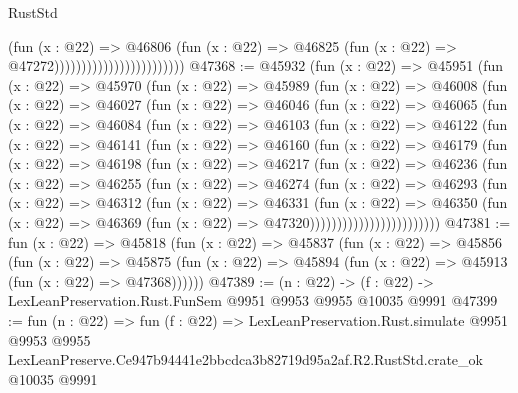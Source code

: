 \begin{lexlean}{RustStd}
\begin{coremodule}
                                              (fun (x : @22) =>
                                              @46806
                                                (fun (x : @22) =>
                                                @46825
                                                  (fun (x : @22) => @47272))))))))))))))))))))))))
@47368 := @45932
    (fun (x : @22) =>
    @45951
      (fun (x : @22) =>
      @45970
        (fun (x : @22) =>
        @45989
          (fun (x : @22) =>
          @46008
            (fun (x : @22) =>
            @46027
              (fun (x : @22) =>
              @46046
                (fun (x : @22) =>
                @46065
                  (fun (x : @22) =>
                  @46084
                    (fun (x : @22) =>
                    @46103
                      (fun (x : @22) =>
                      @46122
                        (fun (x : @22) =>
                        @46141
                          (fun (x : @22) =>
                          @46160
                            (fun (x : @22) =>
                            @46179
                              (fun (x : @22) =>
                              @46198
                                (fun (x : @22) =>
                                @46217
                                  (fun (x : @22) =>
                                  @46236
                                    (fun (x : @22) =>
                                    @46255
                                      (fun (x : @22) =>
                                      @46274
                                        (fun (x : @22) =>
                                        @46293
                                          (fun (x : @22) =>
                                          @46312
                                            (fun (x : @22) =>
                                            @46331
                                              (fun (x : @22) =>
                                              @46350
                                                (fun (x : @22) =>
                                                @46369
                                                  (fun (x : @22) => @47320))))))))))))))))))))))))
@47381 := fun (x : @22) =>
  @45818
    (fun (x : @22) =>
    @45837
      (fun (x : @22) =>
      @45856
        (fun (x : @22) =>
        @45875 (fun (x : @22) => @45894 (fun (x : @22) => @45913 (fun (x : @22) => @47368))))))
@47389 := (n : @22) -> (f : @22) -> LexLeanPreservation.Rust.FunSem @9951 @9953 @9955 @10035 @9991
@47399 := fun (n : @22) =>
  fun (f : @22) =>
  LexLeanPreservation.Rust.simulate
    @9951
    @9953
    @9955
    LexLeanPreserve.Ce947b94441e2bbcdca3b82719d95a2af.R2.RustStd.crate_ok
    @10035
    @9991
\end{coremodule}
\end{lexlean}
